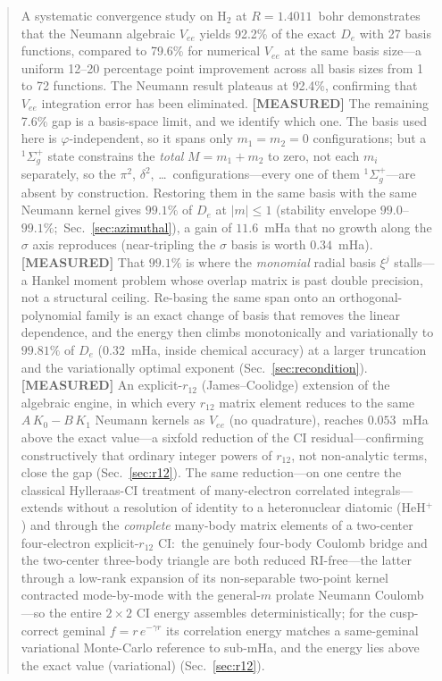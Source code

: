 \documentclass[aps,pra,twocolumn,superscriptaddress,longbibliography]{revtex4-2}
\newcommand{\gvq}[2]{#2}
\begin{document}
\begin{abstract}
A systematic convergence study on H$_2$ at $R = 1.4011$~bohr
demonstrates that the Neumann algebraic $V_{ee}$ yields 92.2\% of
the exact $D_e$ with 27 basis functions, compared to 79.6\% for
numerical $V_{ee}$ at the same basis size---a uniform 12--20
percentage point improvement across all basis sizes from 1 to 72
functions.  The Neumann result plateaus at 92.4\%, confirming that
$V_{ee}$ integration error has been eliminated.  \textbf{[MEASURED]}
The remaining 7.6\% gap is a basis-space limit, and we identify which
one.  The basis used here is $\varphi$-independent, so it spans only
$m_1 = m_2 = 0$ configurations; but a $^1\Sigma_g^+$ state constrains
the \emph{total} $M = m_1 + m_2$ to zero, not each $m_i$
separately, so the $\pi^2$, $\delta^2$, \ldots\ configurations---every
one of them $^1\Sigma_g^+$---are absent by construction.  Restoring
them in the same basis with the same Neumann kernel gives
$99.1\%$ of $D_e$ at $|m| \le 1$ (stability envelope
$99.0$--$99.1\%$;\ Sec.~\ref{sec:azimuthal}), a gain of $11.6$~mHa that
no growth along the $\sigma$ axis reproduces (near-tripling the
$\sigma$ basis is worth $0.34$~mHa).  \textbf{[MEASURED]} That $99.1\%$
is where the \emph{monomial} radial basis $\xi^j$ stalls---a Hankel
moment problem whose overlap matrix is past double precision, not a
structural ceiling.  Re-basing the same span onto an
orthogonal-polynomial family is an exact change of basis that removes
the linear dependence, and the energy then climbs monotonically and
variationally to $\gvq{p12_rebased_de_pct_aopt}{99.81}\%$ of $D_e$
($\gvq{p12_rebased_err_mha_aopt}{0.32}$~mHa, inside chemical accuracy) at a
larger truncation and the variationally optimal exponent
(Sec.~\ref{sec:recondition}).  \textbf{[MEASURED]}
An explicit-$r_{12}$ (James--Coolidge) extension of the algebraic engine,
in which every $r_{12}$ matrix element reduces to the same
$A\,K_0 - B\,K_1$ Neumann kernels as $V_{ee}$ (no quadrature), reaches
$\gvq{p12_r12_err_mha}{0.053}$~mHa above the exact value---a sixfold
reduction of the CI residual---confirming constructively that ordinary
integer powers of $r_{12}$, not non-analytic terms, close the gap
(Sec.~\ref{sec:r12}).  The same reduction---on one centre the classical
Hylleraas-CI treatment of many-electron correlated integrals---extends without
a resolution of identity to a heteronuclear diatomic (HeH$^+$) and through the \emph{complete}
many-body matrix elements of a two-center four-electron explicit-$r_{12}$ CI:\
the genuinely four-body Coulomb bridge and the two-center three-body triangle
are both reduced RI-free---the latter through a low-rank expansion of its
non-separable two-point kernel contracted mode-by-mode with the general-$m$
prolate Neumann Coulomb---so the entire $2\times2$ CI energy assembles
deterministically; for the cusp-correct geminal $f = r\,e^{-\gamma r}$ its
correlation energy matches a same-geminal variational Monte-Carlo reference to
sub-mHa, and the energy lies above the exact value (variational) (Sec.~\ref{sec:r12}).
\end{abstract}
\end{document}
